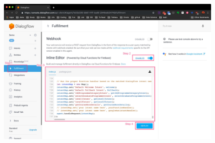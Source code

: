 	\begin{figure}[H]
		\centering
		\includegraphics[width=\linewidth, frame]{img/manual_15.jpg}
	\end{figure}

